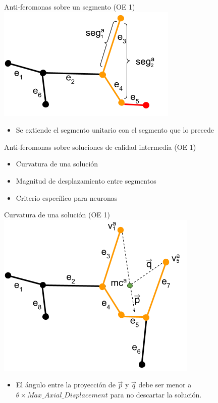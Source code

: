 \begin{frame}{Anti-feromonas sobre un segmento (OE 1)}
\centering
    \includegraphics[scale=0.5]{Pictures/ant_segments_complex_case_B2_extended.png}
    \begin{itemize}
        \item Se extiende el segmento unitario con el segmento que lo precede
    \end{itemize}
\end{frame}

\begin{frame}{Anti-feromonas sobre soluciones de calidad intermedia (OE 1)}
\begin{itemize}
    \item Curvatura de una soluci\'on
    \item Magnitud de desplazamiento entre segmentos
    \item Criterio espec\'ifico para neuronas
\end{itemize}
\end{frame}

\begin{frame}{Curvatura de una soluci\'on (OE 1)}
\centering
    \includegraphics[scale=0.5]{Pictures/ant_curvature_case.png}
    \begin{itemize}
        \item El \'angulo entre la proyecci\'on de $\Vec{p}$ y $\Vec{q}$ debe ser menor a $\theta \times Max\_Axial\_Displacement$ para no descartar la soluci\'on.
    \end{itemize}
\end{frame}

